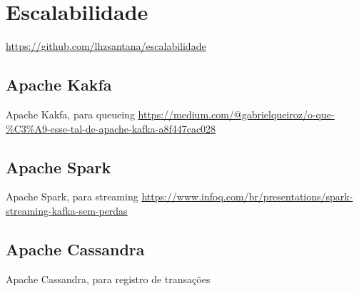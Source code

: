 \chapter{Escalabilidade}

\url{https://github.com/lhzsantana/escalabilidade}

\section{Apache Kakfa}
Apache Kakfa, para queueing
\url{https://medium.com/@gabrielqueiroz/o-que-%C3%A9-esse-tal-de-apache-kafka-a8f447cac028}

\section{Apache Spark}
Apache Spark, para streaming
\url{https://www.infoq.com/br/presentations/spark-streaming-kafka-sem-perdas}

\section{Apache Cassandra}
Apache Cassandra, para registro de transações

% 
